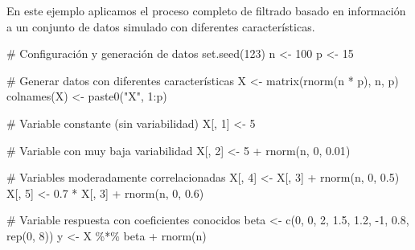 \documentclass[
  letterpaper,
  DIV=11,
  numbers=noendperiod]{scrreprt}
\newenvironment{Shaded}{\begin{snugshade}}{\end{snugshade}}
\newcommand{\CommentTok}[1]{\textcolor[rgb]{0.37,0.37,0.37}{#1}}
\newcommand{\DecValTok}[1]{\textcolor[rgb]{0.68,0.00,0.00}{#1}}
\newcommand{\FloatTok}[1]{\textcolor[rgb]{0.68,0.00,0.00}{#1}}
\newcommand{\FunctionTok}[1]{\textcolor[rgb]{0.28,0.35,0.67}{#1}}
\newcommand{\NormalTok}[1]{\textcolor[rgb]{0.00,0.23,0.31}{#1}}
\newcommand{\OtherTok}[1]{\textcolor[rgb]{0.00,0.23,0.31}{#1}}
\newcommand{\SpecialCharTok}[1]{\textcolor[rgb]{0.37,0.37,0.37}{#1}}
\newcommand{\StringTok}[1]{\textcolor[rgb]{0.13,0.47,0.30}{#1}}
\begin{document}
\begin{tcolorbox}[enhanced jigsaw, leftrule=.75mm, breakable, colbacktitle=quarto-callout-tip-color!10!white, bottomrule=.15mm, colframe=quarto-callout-tip-color-frame, toprule=.15mm, colback=white, coltitle=black, bottomtitle=1mm, left=2mm, title=\textcolor{quarto-callout-tip-color}{\faLightbulb}\hspace{0.5em}{Ejemplo de filtrado inicial}, opacityback=0, arc=.35mm, opacitybacktitle=0.6, toptitle=1mm, titlerule=0mm, rightrule=.15mm]

En este ejemplo aplicamos el proceso completo de filtrado basado en
información a un conjunto de datos simulado con diferentes
características.

\begin{Shaded}
\begin{Highlighting}[]
\CommentTok{\# Configuración y generación de datos}
\FunctionTok{set.seed}\NormalTok{(}\DecValTok{123}\NormalTok{)}
\NormalTok{n }\OtherTok{\textless{}{-}} \DecValTok{100}
\NormalTok{p }\OtherTok{\textless{}{-}} \DecValTok{15}

\CommentTok{\# Generar datos con diferentes características}
\NormalTok{X }\OtherTok{\textless{}{-}} \FunctionTok{matrix}\NormalTok{(}\FunctionTok{rnorm}\NormalTok{(n }\SpecialCharTok{*}\NormalTok{ p), n, p)}
\FunctionTok{colnames}\NormalTok{(X) }\OtherTok{\textless{}{-}} \FunctionTok{paste0}\NormalTok{(}\StringTok{"X"}\NormalTok{, }\DecValTok{1}\SpecialCharTok{:}\NormalTok{p)}

\CommentTok{\# Variable constante (sin variabilidad)}
\NormalTok{X[, }\DecValTok{1}\NormalTok{] }\OtherTok{\textless{}{-}} \DecValTok{5}

\CommentTok{\# Variable con muy baja variabilidad  }
\NormalTok{X[, }\DecValTok{2}\NormalTok{] }\OtherTok{\textless{}{-}} \DecValTok{5} \SpecialCharTok{+} \FunctionTok{rnorm}\NormalTok{(n, }\DecValTok{0}\NormalTok{, }\FloatTok{0.01}\NormalTok{)}

\CommentTok{\# Variables moderadamente correlacionadas}
\NormalTok{X[, }\DecValTok{4}\NormalTok{] }\OtherTok{\textless{}{-}}\NormalTok{ X[, }\DecValTok{3}\NormalTok{] }\SpecialCharTok{+} \FunctionTok{rnorm}\NormalTok{(n, }\DecValTok{0}\NormalTok{, }\FloatTok{0.5}\NormalTok{)}
\NormalTok{X[, }\DecValTok{5}\NormalTok{] }\OtherTok{\textless{}{-}} \FloatTok{0.7} \SpecialCharTok{*}\NormalTok{ X[, }\DecValTok{3}\NormalTok{] }\SpecialCharTok{+} \FunctionTok{rnorm}\NormalTok{(n, }\DecValTok{0}\NormalTok{, }\FloatTok{0.6}\NormalTok{)}

\CommentTok{\# Variable respuesta con coeficientes conocidos}
\NormalTok{beta }\OtherTok{\textless{}{-}} \FunctionTok{c}\NormalTok{(}\DecValTok{0}\NormalTok{, }\DecValTok{0}\NormalTok{, }\DecValTok{2}\NormalTok{, }\FloatTok{1.5}\NormalTok{, }\FloatTok{1.2}\NormalTok{, }\SpecialCharTok{{-}}\DecValTok{1}\NormalTok{, }\FloatTok{0.8}\NormalTok{, }\FunctionTok{rep}\NormalTok{(}\DecValTok{0}\NormalTok{, }\DecValTok{8}\NormalTok{))}
\NormalTok{y }\OtherTok{\textless{}{-}}\NormalTok{ X }\SpecialCharTok{\%*\%}\NormalTok{ beta }\SpecialCharTok{+} \FunctionTok{rnorm}\NormalTok{(n)}


\end{Highlighting}
\end{Shaded}
\end{tcolorbox}
\end{document}
